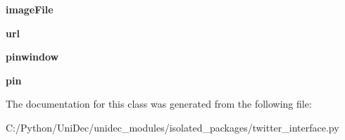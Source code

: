 \begin{DoxyCompactItemize}
\item 
\hypertarget{class_uni_dec_1_1unidec__modules_1_1isolated__packages_1_1twitter__interface_1_1_twitter_window_a41363c09c499b0ad207d38fbbf29f34d}{}{\bfseries image\+File}\label{class_uni_dec_1_1unidec__modules_1_1isolated__packages_1_1twitter__interface_1_1_twitter_window_a41363c09c499b0ad207d38fbbf29f34d}

\item 
\hypertarget{class_uni_dec_1_1unidec__modules_1_1isolated__packages_1_1twitter__interface_1_1_twitter_window_ae221949c5fb99f961ee2906d7263b954}{}{\bfseries url}\label{class_uni_dec_1_1unidec__modules_1_1isolated__packages_1_1twitter__interface_1_1_twitter_window_ae221949c5fb99f961ee2906d7263b954}

\item 
\hypertarget{class_uni_dec_1_1unidec__modules_1_1isolated__packages_1_1twitter__interface_1_1_twitter_window_acd89253cee9b5c82a4971c0639e34c38}{}{\bfseries pinwindow}\label{class_uni_dec_1_1unidec__modules_1_1isolated__packages_1_1twitter__interface_1_1_twitter_window_acd89253cee9b5c82a4971c0639e34c38}

\item 
\hypertarget{class_uni_dec_1_1unidec__modules_1_1isolated__packages_1_1twitter__interface_1_1_twitter_window_a3efa594ce1668c20970f6201824f3556}{}{\bfseries pin}\label{class_uni_dec_1_1unidec__modules_1_1isolated__packages_1_1twitter__interface_1_1_twitter_window_a3efa594ce1668c20970f6201824f3556}

\end{DoxyCompactItemize}


The documentation for this class was generated from the following file\+:\begin{DoxyCompactItemize}
\item 
C\+:/\+Python/\+Uni\+Dec/unidec\+\_\+modules/isolated\+\_\+packages/twitter\+\_\+interface.\+py\end{DoxyCompactItemize}
